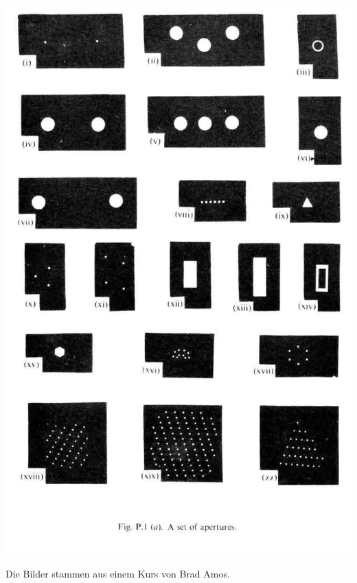 \documentclass{article}
\begin{document}
\includegraphics[height=.72\textheight, angle=90]{RealSpace}

{\tiny Die Bilder stammen aus einem Kurs von Brad Amos.}
\end{document}
